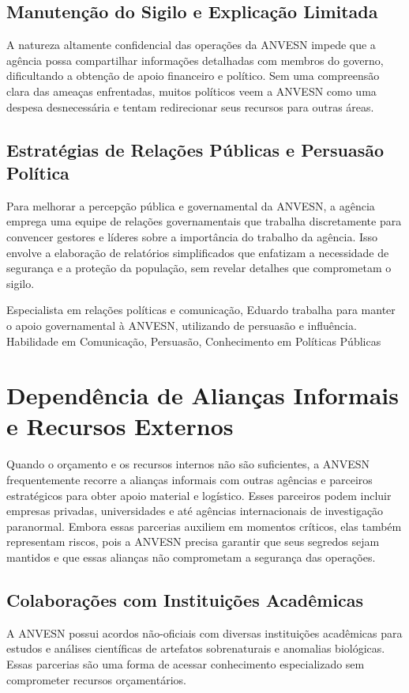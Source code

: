 \subsection{Manutenção do Sigilo e Explicação Limitada}
A natureza altamente confidencial das operações da ANVESN impede que a agência possa compartilhar informações detalhadas com membros do governo, dificultando a obtenção de apoio financeiro e político. Sem uma compreensão clara das ameaças enfrentadas, muitos políticos veem a ANVESN como uma despesa desnecessária e tentam redirecionar seus recursos para outras áreas.

\subsection{Estratégias de Relações Públicas e Persuasão Política}
Para melhorar a percepção pública e governamental da ANVESN, a agência emprega uma equipe de relações governamentais que trabalha discretamente para convencer gestores e líderes sobre a importância do trabalho da agência. Isso envolve a elaboração de relatórios simplificados que enfatizam a necessidade de segurança e a proteção da população, sem revelar detalhes que comprometam o sigilo.

{Especialista em relações políticas e comunicação, Eduardo trabalha para manter o apoio governamental à ANVESN, utilizando de persuasão e influência.}
{Habilidade em Comunicação, Persuasão, Conhecimento em Políticas Públicas}

\section{Dependência de Alianças Informais e Recursos Externos}
Quando o orçamento e os recursos internos não são suficientes, a ANVESN frequentemente recorre a alianças informais com outras agências e parceiros estratégicos para obter apoio material e logístico. Esses parceiros podem incluir empresas privadas, universidades e até agências internacionais de investigação paranormal. Embora essas parcerias auxiliem em momentos críticos, elas também representam riscos, pois a ANVESN precisa garantir que seus segredos sejam mantidos e que essas alianças não comprometam a segurança das operações.

\subsection{Colaborações com Instituições Acadêmicas}
A ANVESN possui acordos não-oficiais com diversas instituições acadêmicas para estudos e análises científicas de artefatos sobrenaturais e anomalias biológicas. Essas parcerias são uma forma de acessar conhecimento especializado sem comprometer recursos orçamentários.

